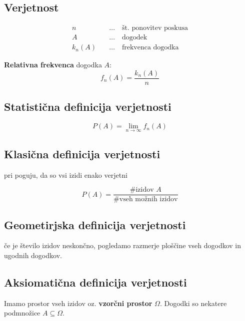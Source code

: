 
 

\begin{multicols}{4}
\setlength{\premulticols}{1pt}
\setlength{\postmulticols}{1pt}
\setlength{\multicolsep}{1pt}
\setlength{\columnsep}{2pt}


\section{Verjetnost}
\begin{align*}
	n \quad & \dots \quad \text{št. ponovitev poskusa} \\
	A \quad & \dots \quad \text{dogodek} \\
	k_n(A) \quad & \dots \quad \text{frekvenca dogodka}
\end{align*}

\textbf{Relativna frekvenca} dogodka $A$:
\[ f_n(A) = \frac{k_n(A)}{n} \]

\subsection{Statistična definicija verjetnosti}
\[ P(A) = \lim_{n \to \infty} f_n(A) \]

\subsection{Klasična definicija verjetnosti}
pri poguju, da so vsi izidi enako verjetni

\[ P(A) = \frac{\text{\# izidov }A}{\text{\# vseh možnih izidov}}\]

\subsection{Geometirjska definicija verjetnosti}
če je število izidov neskončno, pogledamo razmerje ploščine vseh dogodkov in ugodnih dogodkov.

\subsection{Aksiomatična definicija verjetnosti}

Imamo prostor vseh izidov oz. \textbf{vzorčni prostor} $\Omega$. Dogodki so nekatere podmnožice $A \subseteq \Omega$.


\end{multicols}
